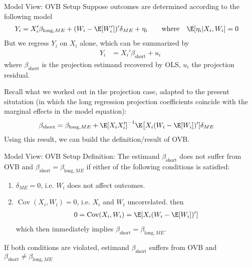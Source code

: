 \documentclass[aspectratio=169, handout]{beamer}
\newcommand{\Cov}{\operatorname{Cov}}
\begin{document}
{\footnotesize
\begin{frame}{Model View: OVB Setup}
Suppose outcomes are determined according to the following model
\begin{align}
  Y_i
  &=
  X_i'\beta_{\text{long},ME}
  +
  (W_i-\E[W_i'])'\delta_{ME}
  +
  \eta_i
  \qquad\text{where}\quad
  \E[\eta_i|X_i,W_i]
  = 0
  \label{model2}
\end{align}
But we regress $Y_i$ on $X_i$ alone,
which can be summarized by
\begin{align*}
  Y_i
  &=
  X_i'\beta_{\text{short}}
  +
  u_i
\end{align*}
where $\beta_{\text{short}}$ is the projection estimand recovered by
OLS, $u_i$ the projection residual.

Recall what we worked out in the projection case, adapted to the
present situtation (in which the long regression projection coefficients
coincide with the marginal effects in the model equation):
\begin{align*}
  \beta_{\text{short}}
  &=
  \beta_{\text{long},ME}
  +
  \E[X_iX_i']^{-1}
  \E\big[
  X_i
  (W_i-\E[W_i])'
  ]
  \delta_{ME}
\end{align*}
Using this result, we can build the definition/result of OVB.
\end{frame}
}

{\footnotesize
\begin{frame}{Model View: OVB Setup}
\alert{Definition}:
The estimand $\beta_{\text{short}}$ does \alert{not} suffer from
\alert{OVB} and
$\beta_{\text{short}}=\beta_{\text{long},ME}$
if \alert{either} of the following conditions is satisfied:
\begin{enumerate}
  \item $\delta_{ME}=0$, i.e.  $W_i$ \alert{does not affect} outcomes.


  \item
    $\Cov(X_i,W_i)=0$, i.e.
    $X_i$ and $W_i$ \alert{uncorrelated}.
    then
    \begin{align*}
      0
      =
      \Cov(X_i,W_i)
      =
      \E[X_i(W_i-\E[W_i])']
    \end{align*}
    which then immediately implies
    $\beta_{\text{short}}=\beta_{\text{long},ME}$.
\end{enumerate}
If both conditions are violated, estimand
$\beta_{\text{short}}$ suffers from OVB and
$\beta_{\text{short}}\neq \beta_{\text{long},ME}$
\end{frame}
}
\end{document}
